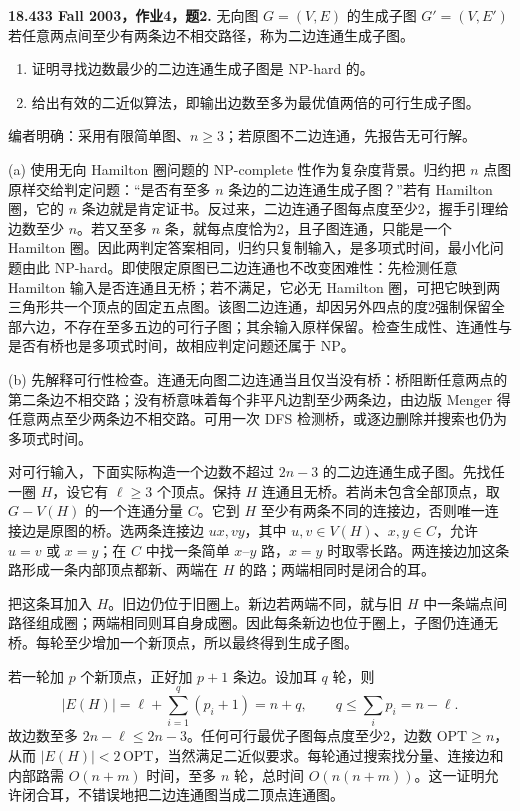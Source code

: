 \begin{exercise}\label{mit:18433-a4-q2}
\textbf{18.433 Fall 2003，作业4，题2.}
无向图 $G=(V,E)$ 的生成子图 $G'=(V,E')$ 若任意两点间至少有两条边不相交路径，称为二边连通生成子图。
\begin{enumerate}[label=(\alph*)]
\item 证明寻找边数最少的二边连通生成子图是 NP-hard 的。
\item 给出有效的二近似算法，即输出边数至多为最优值两倍的可行生成子图。
\end{enumerate}
编者明确：采用有限简单图、$n\ge3$；若原图不二边连通，先报告无可行解。
\end{exercise}
\begin{solution}
(a) 使用无向 Hamilton 圈问题的 NP-complete 性作为复杂度背景。归约把 $n$ 点图原样交给判定问题：“是否有至多 $n$ 条边的二边连通生成子图？”若有 Hamilton 圈，它的 $n$ 条边就是肯定证书。反过来，二边连通子图每点度至少2，握手引理给边数至少 $n$。若又至多 $n$ 条，就每点度恰为2，且子图连通，只能是一个 Hamilton 圈。因此两判定答案相同，归约只复制输入，是多项式时间，最小化问题由此 NP-hard。即使限定原图已二边连通也不改变困难性：先检测任意 Hamilton 输入是否连通且无桥；若不满足，它必无 Hamilton 圈，可把它映到两三角形共一个顶点的固定五点图。该图二边连通，却因另外四点的度2强制保留全部六边，不存在至多五边的可行子图；其余输入原样保留。检查生成性、连通性与是否有桥也是多项式时间，故相应判定问题还属于 NP。

(b) 先解释可行性检查。连通无向图二边连通当且仅当没有桥：桥阻断任意两点的第二条边不相交路；没有桥意味着每个非平凡边割至少两条边，由边版 Menger 得任意两点至少两条边不相交路。可用一次 DFS 检测桥，或逐边删除并搜索也仍为多项式时间。

对可行输入，下面实际构造一个边数不超过 $2n-3$ 的二边连通生成子图。先找任一圈 $H$，设它有 $\ell\ge3$ 个顶点。保持 $H$ 连通且无桥。若尚未包含全部顶点，取 $G-V(H)$ 的一个连通分量 $C$。它到 $H$ 至少有两条不同的连接边，否则唯一连接边是原图的桥。选两条连接边 $ux,vy$，其中 $u,v\in V(H)$、$x,y\in C$，允许 $u=v$ 或 $x=y$；在 $C$ 中找一条简单 $x$--$y$ 路，$x=y$ 时取零长路。两连接边加这条路形成一条内部顶点都新、两端在 $H$ 的路；两端相同时是闭合的耳。

把这条耳加入 $H$。旧边仍位于旧圈上。新边若两端不同，就与旧 $H$ 中一条端点间路径组成圈；两端相同则耳自身成圈。因此每条新边也位于圈上，子图仍连通无桥。每轮至少增加一个新顶点，所以最终得到生成子图。

若一轮加 $p$ 个新顶点，正好加 $p+1$ 条边。设加耳 $q$ 轮，则
\[
 |E(H)|=\ell+\sum_{i=1}^q(p_i+1)=n+q,
 \qquad q\le\sum_i p_i=n-\ell.
\]
故边数至多 $2n-\ell\le2n-3$。任何可行最优子图每点度至少2，边数 $\mathrm{OPT}\ge n$，从而 $|E(H)|<2\,\mathrm{OPT}$，当然满足二近似要求。每轮通过搜索找分量、连接边和内部路需 $O(n+m)$ 时间，至多 $n$ 轮，总时间 $O(n(n+m))$。这一证明允许闭合耳，不错误地把二边连通图当成二顶点连通图。
\end{solution}

